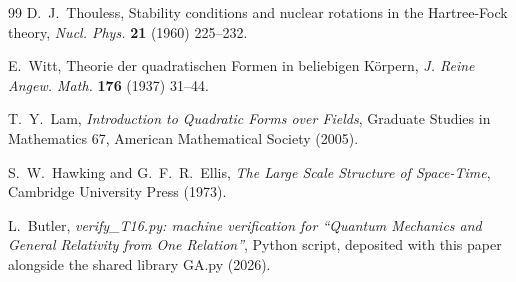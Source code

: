 \documentclass[11pt]{article}
\theoremstyle{definition}
\begin{document}
\begin{thebibliography}{99}
D.~J.~Thouless,
Stability conditions and nuclear rotations in the Hartree-Fock theory,
\emph{Nucl. Phys.} \textbf{21} (1960) 225--232.

E.~Witt,
Theorie der quadratischen Formen in beliebigen K\"orpern,
\emph{J. Reine Angew. Math.} \textbf{176} (1937) 31--44.

T.~Y.~Lam,
\emph{Introduction to Quadratic Forms over Fields},
Graduate Studies in Mathematics 67, American Mathematical Society (2005).

S.~W.~Hawking and G.~F.~R.~Ellis,
\emph{The Large Scale Structure of Space-Time},
Cambridge University Press (1973).

L.~Butler,
\emph{verify\_T16.py: machine verification for ``Quantum Mechanics and General Relativity from One Relation''},
Python script, deposited with this paper alongside the shared library GA.py (2026).

\end{thebibliography}
\end{document}
